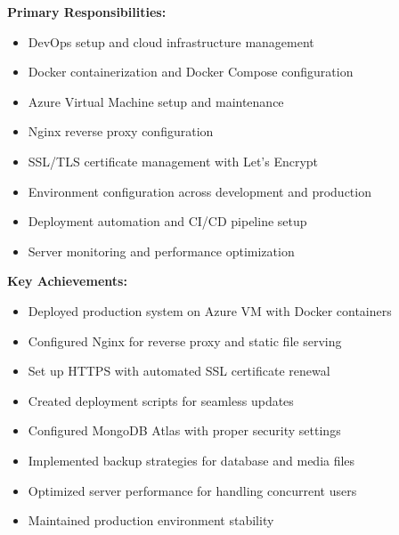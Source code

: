 \documentclass[12pt,a4paper]{article}
\begin{document}
\begin{tcolorbox}[colback=LightGold, colframe=Gold, title=\textbf{Mst. Irin Sultana (Roll: 41) — DevOps \& Infrastructure Engineer}, fonttitle=\bfseries\large]

\textbf{Primary Responsibilities:}
\begin{itemize}[noitemsep]
  \item DevOps setup and cloud infrastructure management
  \item Docker containerization and Docker Compose configuration
  \item Azure Virtual Machine setup and maintenance
  \item Nginx reverse proxy configuration
  \item SSL/TLS certificate management with Let's Encrypt
  \item Environment configuration across development and production
  \item Deployment automation and CI/CD pipeline setup
  \item Server monitoring and performance optimization
\end{itemize}

\textbf{Key Achievements:}
\begin{itemize}[noitemsep]
  \item Deployed production system on Azure VM with Docker containers
  \item Configured Nginx for reverse proxy and static file serving
  \item Set up HTTPS with automated SSL certificate renewal
  \item Created deployment scripts for seamless updates
  \item Configured MongoDB Atlas with proper security settings
  \item Implemented backup strategies for database and media files
  \item Optimized server performance for handling concurrent users
  \item Maintained production environment stability
\end{itemize}
\end{tcolorbox}

\vspace{10pt}
\end{document}

